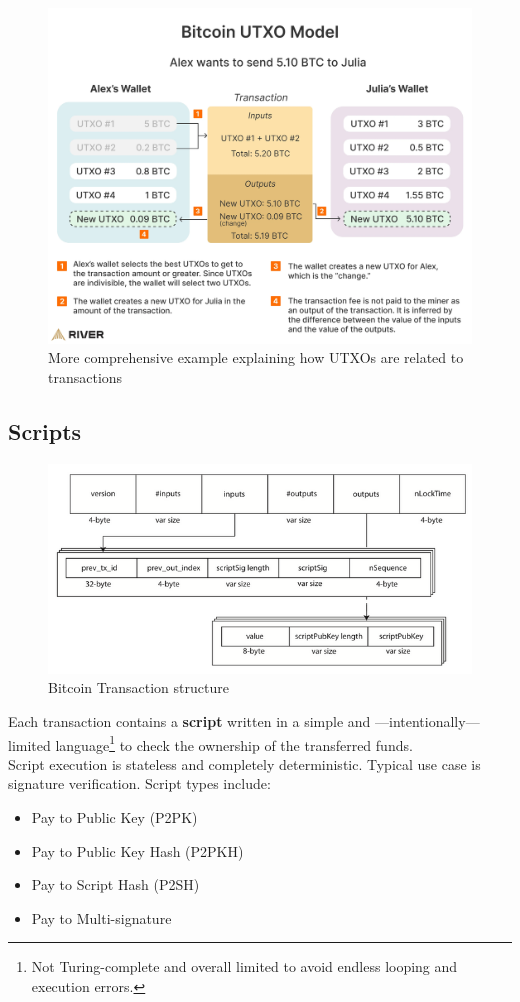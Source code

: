 \begin{figure}[htbp]
   \centering
   \includegraphics{images/bitcoin_utxo_model.png}
   \caption{More comprehensive example explaining how UTXOs are related to transactions}
   \label{fig:bitcoin_utxo_model}
\end{figure}


\newpage
\subsection{Scripts}
\begin{figure}[htbp]
   \centering
   \includegraphics{images/bitcoin_transactionStructure.png}
   \caption{Bitcoin Transaction structure}
   \label{fig:bitcoin_transactionStructure}
\end{figure}

Each transaction contains a \textbf{script} written in a simple and ---intentionally--- limited language\footnote{Not Turing-complete and overall limited to avoid endless looping and execution errors.} to check the ownership of the transferred funds.\\
Script execution is stateless and completely deterministic.
Typical use case is signature verification.
Script types include:
\begin{itemize}
   \item Pay to Public Key (P2PK)
   \item Pay to Public Key Hash (P2PKH)
   \item Pay to Script Hash (P2SH)
   \item Pay to Multi-signature
\end{itemize}


